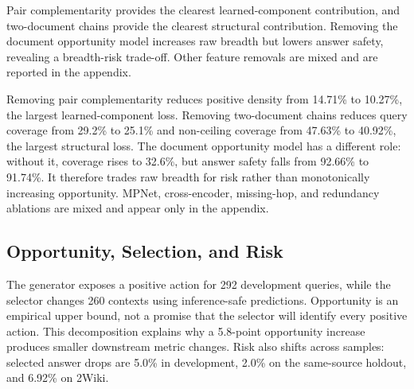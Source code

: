 \begin{table}[t]
\centering
\small
\caption{Core generator ablations on fully nested development actions}
\label{tab:3}
\end{table}

Pair complementarity provides the clearest learned-component contribution, and two-document chains provide the clearest structural contribution. Removing the document opportunity model increases raw breadth but lowers answer safety, revealing a breadth-risk trade-off. Other feature removals are mixed and are reported in the appendix.

Removing pair complementarity reduces positive density from 14.71\% to 10.27\%, the largest learned-component loss. Removing two-document chains reduces query coverage from 29.2\% to 25.1\% and non-ceiling coverage from 47.63\% to 40.92\%, the largest structural loss. The document opportunity model has a different role: without it, coverage rises to 32.6\%, but answer safety falls from 92.66\% to 91.74\%. It therefore trades raw breadth for risk rather than monotonically increasing opportunity. MPNet, cross-encoder, missing-hop, and redundancy ablations are mixed and appear only in the appendix.

\subsection{Opportunity, Selection, and Risk}

The generator exposes a positive action for 292 development queries, while the selector changes 260 contexts using inference-safe predictions. Opportunity is an empirical upper bound, not a promise that the selector will identify every positive action. This decomposition explains why a 5.8-point opportunity increase produces smaller downstream metric changes. Risk also shifts across samples: selected answer drops are 5.0\% in development, 2.0\% on the same-source holdout, and 6.92\% on 2Wiki.

